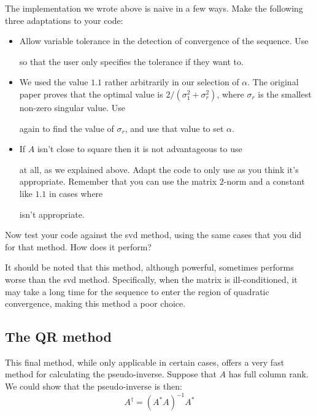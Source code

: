 \begin{problem}
The implementation we wrote above is naive in a few ways. Make the following three adaptations to your code:
\begin{itemize}
\item Allow variable tolerance in the detection of convergence of the sequence. Use \begin{matlab}\end{matlab}\begin{python}\end{python} so that the user only specifies the tolerance if they want to.
\item We used the value $1.1$ rather arbitrarily in our selection of $\alpha$. The original paper proves that the optimal value is $2/(\sigma_1^2 + \sigma_r^2)$, where $\sigma_r$ is the smallest non-zero singular value. Use \begin{matlab}\end{matlab} again to find the value of $\sigma_r$, and use that value to set $\alpha$.
\item If $A$ isn't close to square then it is not advantageous to use \begin{matlab}\end{matlab} at all, as we explained above. Adapt the code to only use  as you think it's appropriate. Remember that you can use the matrix $2$-norm and a constant like $1.1$ in cases where \begin{matlab}\end{matlab} isn't appropriate.
\end{itemize}

Now test your code against the svd method, using the same cases that you did for that method. How does it perform?
\end{problem}

It should be noted that this method, although powerful, sometimes performs worse than the svd method. Specifically, when the matrix is ill-conditioned, it may take a long time for the sequence to enter the region of quadratic convergence, making this method a poor choice.

\subsection*{The QR method}

This final method, while only applicable in certain cases, offers a very fast method for calculating the pseudo-inverse. Suppose that $A$ has full column rank. We could show that the pseudo-inverse is then:
\[
A^\dagger = (A^* A)^{-1} A^*
\]


